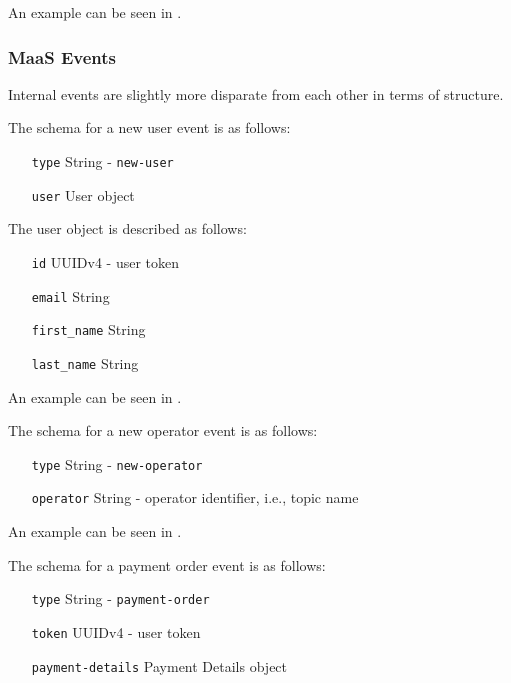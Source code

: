 \documentclass[runningheads,a4]{llncs}
\begin{document}
An example can be seen in .

\subsubsection{\acs{MaaS} Events}
\label{sec:kafka.events.maas}
Internal events are slightly more disparate from each other in terms of
structure.

The schema for a new user event is as follows:

\begin{itemize}[leftmargin=7em]
  \item[\texttt{type}] String - \texttt{new-user}
  \item[\texttt{user}] User object
\end{itemize}

\clearpage
The user object is described as follows:

\begin{itemize}[leftmargin=9em]
  \item[\texttt{id}] UUIDv4 - user token
  \item[\texttt{email}] String
  \item[\texttt{first\_name}] String
  \item[\texttt{last\_name}] String
\end{itemize}

An example can be seen in .


The schema for a new operator event is as follows:

\begin{itemize}[leftmargin=8em]
  \item[\texttt{type}] String - \texttt{new-operator}
  \item[\texttt{operator}] String - operator identifier, i.e., topic name
\end{itemize}

An example can be seen in .


The schema for a payment order event is as follows:

\begin{itemize}[leftmargin=12em]
  \item[\texttt{type}] String - \texttt{payment-order}
  \item[\texttt{token}] UUIDv4 - user token
  \item[\texttt{payment-details}] Payment Details object 
\end{itemize}
\end{document}
